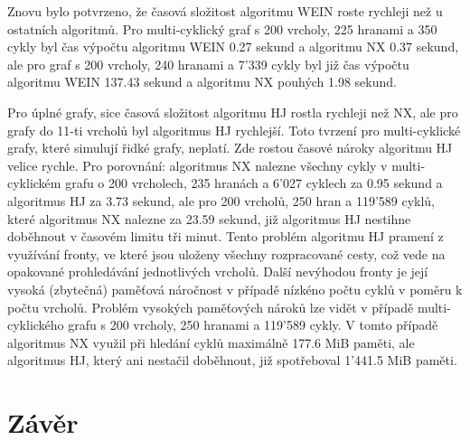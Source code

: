         Znovu bylo potvrzeno, že časová složitost algoritmu WEIN roste rychleji než u ostatních algoritmů. Pro multi-cyklický graf s 200 vrcholy, 225 hranami a 350 cykly byl čas výpočtu algoritmu WEIN 0.27 sekund a algoritmu NX 0.37 sekund, ale pro graf s 200 vrcholy, 240 hranami a 7'339 cykly byl již čas výpočtu algoritmu WEIN 137.43 sekund a algoritmu NX pouhých 1.98 sekund.

        Pro úplné grafy, sice časová složitost algoritmu HJ rostla rychleji než NX, ale pro grafy do 11-ti vrcholů byl algoritmus HJ rychlejší. Toto tvrzení pro multi-cyklické grafy, které simulují řidké grafy, neplatí. Zde rostou časové nároky algoritmu HJ velice rychle. Pro porovnání: algoritmus NX nalezne všechny cykly v multi-cyklickém grafu o 200 vrcholech, 235 hranách a 6'027 cyklech za 0.95 sekund a algoritmus HJ za 3.73 sekund, ale pro 200 vrcholů, 250 hran a 119'589 cyklů, které algoritmus NX nalezne za 23.59 sekund, již algoritmus HJ nestihne doběhnout v časovém limitu tři minut. Tento problém algoritmu HJ pramení z využívání fronty, ve které jsou uloženy všechny rozpracované cesty, což vede na opakované prohledávání jednotlivých vrcholů. Další nevýhodou fronty je její vysoká (zbytečná) paměťová náročnost v případě nízkéno počtu cyklů v poměru k počtu vrcholů. Problém vysokých paměťových nároků lze vidět v případě multi-cyklického grafu s 200 vrcholy, 250 hranami a 119'589 cykly. V tomto případě algoritmus NX využil při hledání cyklů maximálně 177.6 MiB paměti, ale algoritmus HJ, který ani nestačil doběhnout, již spotřeboval 1'441.5 MiB paměti.

\chapter{Závěr}
    \label{chapter:Conclusion}
    \lipsum[2]
